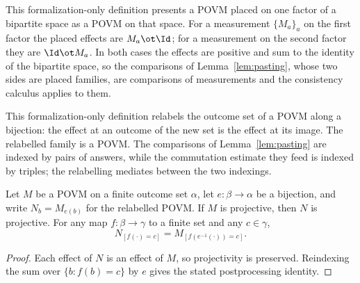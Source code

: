 \begin{definition}
	\label{def:pasting-tensor-placement}
	\leanok
	This formalization-only definition presents a POVM placed on one factor of a
	bipartite space as a POVM on that space. For a measurement $\{M_a\}_a$ on the
	first factor the placed effects are $M_a \ot \Id$; for a measurement on the
	second factor they are $\Id \ot M_a$. In both cases the effects are positive
	and sum to the identity of the bipartite space, so the comparisons of
	Lemma~\ref{lem:pasting}, whose two sides are placed families, are comparisons
	of measurements and the consistency calculus applies to them.
\end{definition}

\begin{definition}
	\label{def:pasting-alphabet-relabelling}
	\leanok
	This formalization-only definition relabels the outcome set of a POVM along
	a bijection: the effect at an outcome of the new set is the effect at its
	image. The relabelled family is a POVM. The
	comparisons of Lemma~\ref{lem:pasting} are indexed by pairs of answers,
	while the commutation estimate they feed is indexed by triples; the
	 relabelling mediates between the two indexings.
\end{definition}

\begin{lemma}
	\label{lem:pasting-alphabet-relabelling}
	\leanok
	Let $M$ be a POVM on a finite outcome set $\alpha$, let
	$e:\beta\to\alpha$ be a bijection, and write $N_b=M_{e(b)}$ for the
	relabelled POVM. If $M$ is projective, then $N$ is projective.
	For any map $f:\beta\to\gamma$ to a finite set and any $c\in\gamma$,
	\[
		N_{[f(\cdot)=c]}=M_{[f(e^{-1}(\cdot))=c]}.
	\]
\end{lemma}
\begin{proof}
	\leanok
	Each effect of $N$ is an effect of $M$, so projectivity is preserved.
	Reindexing the sum over $\{b:f(b)=c\}$ by $e$ gives the stated
	postprocessing identity.
\end{proof}


